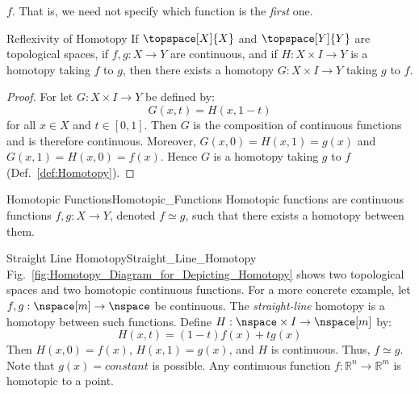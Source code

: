 \documentclass{article}                                                        %
\begin{document}
        $f$. That is, we need not specify which function is the \textit{first}
        one.
        \begin{ltheorem}{Reflexivity of Homotopy}
            If $\topspace[X]{X}$ and $\topspace[Y]{Y}$ are topological spaces,
            if $f,g:X\rightarrow{Y}$ are continuous, and if
            $H:X\times{I}\rightarrow{Y}$ is a homotopy taking $f$ to $g$, then
            there exists a homotopy $G:X\times{I}\rightarrow{Y}$ taking $g$ to
            $f$.
        \end{ltheorem}
        \begin{proof}
            For let $G:X\times{I}\rightarrow{Y}$ be defined by:
            \begin{equation}
                G(x,t)=H(x,1-t)
            \end{equation}
            for all $x\in{X}$ and $t\in[0,1]$. Then $G$ is the composition of
            continuous functions and is therefore continuous. Moreover,
            $G(x,0)=H(x,1)=g(x)$ and $G(x,1)=H(x,0)=f(x)$. Hence $G$ is a
            homotopy taking $g$ to $f$ (Def.~\ref{def:Homotopy}).
        \end{proof}
        \begin{fdefinition}{Homotopic Functions}{Homotopic_Functions}
            Homotopic functions are continuous functions
            $f,g:{X}\rightarrow{Y}$, denoted ${f}\simeq{g}$,
            such that there exists a homotopy between them.
        \end{fdefinition}
        \begin{lexample}{Straight Line Homotopy}{Straight_Line_Homotopy}
            Fig.~\ref{fig:Homotopy_Diagram_for_Depicting_Homotopy} shows
            two topological spaces and two homotopic continuous functions.
            For a more concrete example, let $f,g:\nspace[m]\rightarrow\nspace$
            be continuous. The \textit{straight-line} homotopy is a homotopy
            between such functions. Define
            $H:\nspace\times{I}\rightarrow\nspace[m]$ by:
            \begin{equation}
                \label{eqn:Straight_Line_Homotopy}%
                H(x,t)=(1-t)f(x)+tg(x)
            \end{equation}
            Then $H(x,0)=f(x)$, $H(x,1)=g(x)$, and $H$ is continuous. Thus,
            ${f}\simeq{g}$. Note that $g(x)=constant$ is possible. Any
            continuous function $f:\mathbb{R}^{n}\rightarrow\mathbb{R}^{m}$
            is homotopic to a point.
        \end{lexample}
\end{document}
